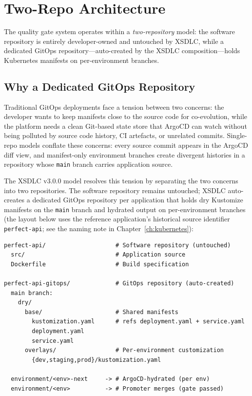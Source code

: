 \section{Two-Repo Architecture}
\label{sec:two-repo}

The quality gate system operates within a \textit{two-repository} model: the software repository is entirely developer-owned and untouched by XSDLC, while a dedicated GitOps repository---auto-created by the XSDLC composition---holds Kubernetes manifests on per-environment branches.

\subsection{Why a Dedicated GitOps Repository}
\label{subsec:why-two-repo}

Traditional GitOps deployments face a tension between two concerns: the developer wants to keep manifests close to the source code for co-evolution, while the platform needs a clean Git-based state store that ArgoCD can watch without being polluted by source code history, CI artefacts, or unrelated commits. Single-repo models conflate these concerns: every source commit appears in the ArgoCD diff view, and manifest-only environment branches create divergent histories in a repository whose \texttt{main} branch carries application source.

The XSDLC v3.0.0 model resolves this tension by separating the two concerns into two repositories. The software repository remains untouched; XSDLC auto-creates a dedicated GitOps repository per application that holds dry Kustomize manifests on the \texttt{main} branch and hydrated output on per-environment branches (the layout below uses the reference application's historical source identifier \texttt{perfect-api}; see the naming note in Chapter~\ref{ch:kubernetes}):

{\footnotesize
\begin{verbatim}
perfect-api/                    # Software repository (untouched)
  src/                          # Application source
  Dockerfile                    # Build specification

perfect-api-gitops/             # GitOps repository (auto-created)
  main branch:
    dry/
      base/                     # Shared manifests
        kustomization.yaml      # refs deployment.yaml + service.yaml
        deployment.yaml
        service.yaml
      overlays/                 # Per-environment customization
        {dev,staging,prod}/kustomization.yaml

  environment/<env>-next     -> # ArgoCD-hydrated (per env)
  environment/<env>          -> # Promoter merges (gate passed)
\end{verbatim}
}

